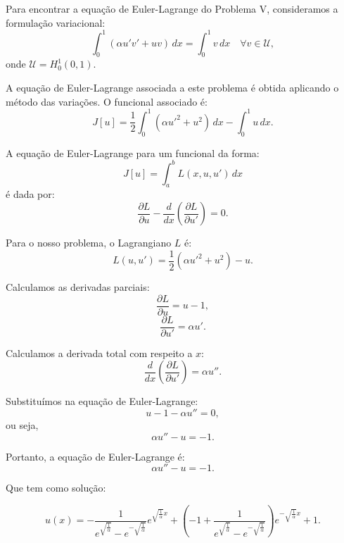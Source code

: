 \documentclass{article}
\begin{document}
Para encontrar a equação de Euler-Lagrange do Problema V, consideramos a formulação variacional:
\[
\int_0^1 (\alpha u'v' + u v) \, dx = \int_0^1 v \, dx \quad \forall v \in \mathcal{U},
\]
onde \(\mathcal{U} = H^1_0(0,1)\).

A equação de Euler-Lagrange associada a este problema é obtida aplicando o método das variações. O funcional associado é:
\[
J[u] = \frac{1}{2} \int_0^1 (\alpha u'^2 + u^2) \, dx - \int_0^1 u \, dx.
\]

A equação de Euler-Lagrange para um funcional da forma:
\[
J[u] = \int_a^b L(x, u, u') \, dx
\]
é dada por:
\[
\frac{\partial L}{\partial u} - \frac{d}{dx} \left( \frac{\partial L}{\partial u'} \right) = 0.
\]

Para o nosso problema, o Lagrangiano \( L \) é:
\[
L(u, u') = \frac{1}{2} (\alpha u'^2 + u^2) - u.
\]

Calculamos as derivadas parciais:
\[
\frac{\partial L}{\partial u} = u - 1,
\]
\[
\frac{\partial L}{\partial u'} = \alpha u'.
\]

Calculamos a derivada total com respeito a \(x\):
\[
\frac{d}{dx} \left( \frac{\partial L}{\partial u'} \right) = \alpha u''.
\]

Substituímos na equação de Euler-Lagrange:
\[
u - 1 - \alpha u'' = 0,
\]
ou seja,
\[
\alpha u'' - u = -1.
\]

Portanto, a equação de Euler-Lagrange é:
\[
\alpha u'' - u = -1.
\]

Que tem como solução:

\[
u(x) = -\frac{1}{e^{\sqrt{\frac{1}{\alpha}}} - e^{-\sqrt{\frac{1}{\alpha}}}} e^{\sqrt{\frac{1}{\alpha}} x} + \left(-1 + \frac{1}{e^{\sqrt{\frac{1}{\alpha}}} - e^{-\sqrt{\frac{1}{\alpha}}}}\right) e^{-\sqrt{\frac{1}{\alpha}} x} + 1.
\]
\end{document}
